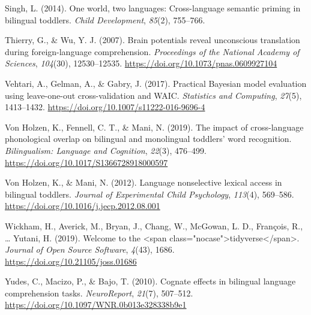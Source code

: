 \documentclass[
  english,
  man,man,floatsintext]{apa6}
\newlength{\cslhangindent}
\newenvironment{cslreferences}%
  {\setlength{\parindent}{0pt}%
  \everypar{\setlength{\hangindent}{\cslhangindent}}\ignorespaces}%
  {\par}
\begin{document}
\begin{cslreferences}
\leavevmode\hypertarget{ref-singh_one_2014}{}%
Singh, L. (2014). One world, two languages: Cross-language semantic priming in bilingual toddlers. \emph{Child Development}, \emph{85}(2), 755--766.

\leavevmode\hypertarget{ref-thierry_brain_2007}{}%
Thierry, G., \& Wu, Y. J. (2007). Brain potentials reveal unconscious translation during foreign-language comprehension. \emph{Proceedings of the National Academy of Sciences}, \emph{104}(30), 12530--12535. \url{https://doi.org/10.1073/pnas.0609927104}

\leavevmode\hypertarget{ref-vehtari_practical_2017}{}%
Vehtari, A., Gelman, A., \& Gabry, J. (2017). Practical Bayesian model evaluation using leave-one-out cross-validation and WAIC. \emph{Statistics and Computing}, \emph{27}(5), 1413--1432. \url{https://doi.org/10.1007/s11222-016-9696-4}

\leavevmode\hypertarget{ref-von_holzen_impact_2019}{}%
Von Holzen, K., Fennell, C. T., \& Mani, N. (2019). The impact of cross-language phonological overlap on bilingual and monolingual toddlers' word recognition. \emph{Bilingualism: Language and Cognition}, \emph{22}(3), 476--499. \url{https://doi.org/10.1017/S1366728918000597}

\leavevmode\hypertarget{ref-von_holzen_language_2012}{}%
Von Holzen, K., \& Mani, N. (2012). Language nonselective lexical access in bilingual toddlers. \emph{Journal of Experimental Child Psychology}, \emph{113}(4), 569--586. \url{https://doi.org/10.1016/j.jecp.2012.08.001}

\leavevmode\hypertarget{ref-wickham_welcome_2019}{}%
Wickham, H., Averick, M., Bryan, J., Chang, W., McGowan, L. D., François, R., \ldots{} Yutani, H. (2019). Welcome to the \textless span class="nocase"\textgreater tidyverse\textless/span\textgreater. \emph{Journal of Open Source Software}, \emph{4}(43), 1686. \url{https://doi.org/10.21105/joss.01686}

\leavevmode\hypertarget{ref-yudes_cognate_2010}{}%
Yudes, C., Macizo, P., \& Bajo, T. (2010). Cognate effects in bilingual language comprehension tasks. \emph{NeuroReport}, \emph{21}(7), 507--512. \url{https://doi.org/10.1097/WNR.0b013e328338b9e1}
\end{cslreferences}

\endgroup
\end{document}
